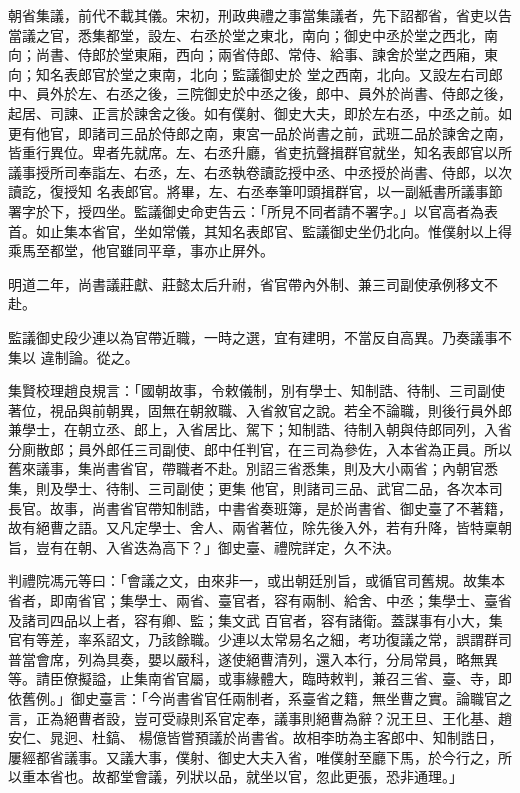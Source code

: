 \begin{pinyinscope}
 朝省集議，前代不載其儀。宋初，刑政典禮之事當集議者，先下詔都省，省吏以告當議之官，悉集都堂，設左、右丞於堂之東北，南向；御史中丞於堂之西北，南向；尚書、侍郎於堂東廂，西向；兩省侍郎、常侍、給事、諫舍於堂之西廂，東向；知名表郎官於堂之東南，北向；監議御史於
 堂之西南，北向。又設左右司郎中、員外於左、右丞之後，三院御史於中丞之後，郎中、員外於尚書、侍郎之後，起居、司諫、正言於諫舍之後。如有僕射、御史大夫，即於左右丞，中丞之前。如更有他官，即諸司三品於侍郎之南，東宮一品於尚書之前，武班二品於諫舍之南，皆重行異位。卑者先就席。左、右丞升廳，省吏抗聲揖群官就坐，知名表郎官以所議事授所司奉詣左、右丞，左、右丞執卷讀訖授中丞、中丞授於尚書、侍郎，以次讀訖，復授知
 名表郎官。將畢，左、右丞奉筆叩頭揖群官，以一副紙書所議事節署字於下，授四坐。監議御史命吏告云：「所見不同者請不署字。」以官高者為表首。如止集本省官，坐如常儀，其知名表郎官、監議御史坐仍北向。惟僕射以上得乘馬至都堂，他官雖同平章，事亦止屏外。



 明道二年，尚書議莊獻、莊懿太后升祔，省官帶內外制、兼三司副使承例移文不赴。



 監議御史段少連以為官帶近職，一時之選，宜有建明，不當反自高異。乃奏議事不集以
 違制論。從之。



 集賢校理趙良規言：「國朝故事，令敕儀制，別有學士、知制誥、待制、三司副使著位，視品與前朝異，固無在朝敘職、入省敘官之說。若全不論職，則後行員外郎兼學士，在朝立丞、郎上，入省居比、駕下；知制誥、待制入朝與侍郎同列，入省分廁散郎；員外郎任三司副使、郎中任判官，在三司為參佐，入本省為正員。所以舊來議事，集尚書省官，帶職者不赴。別詔三省悉集，則及大小兩省；內朝官悉集，則及學士、待制、三司副使；更集
 他官，則諸司三品、武官二品，各次本司長官。故事，尚書省官帶知制誥，中書省奏班簿，是於尚書省、御史臺了不著籍，故有絕曹之語。又凡定學士、舍人、兩省著位，除先後入外，若有升降，皆特稟朝旨，豈有在朝、入省迭為高下？」御史臺、禮院詳定，久不決。



 判禮院馮元等曰：「會議之文，由來非一，或出朝廷別旨，或循官司舊規。故集本省者，即南省官；集學士、兩省、臺官者，容有兩制、給舍、中丞；集學士、臺省及諸司四品以上者，容有卿、監；集文武
 百官者，容有諸衛。蓋謀事有小大，集官有等差，率系詔文，乃該餘職。少連以太常易名之細，考功復議之常，誤謂群司普當會席，列為具奏，嬰以嚴科，遂使絕曹清列，還入本行，分局常員，略無異等。請臣僚擬謚，止集南省官屬，或事緣體大，臨時敕判，兼召三省、臺、寺，即依舊例。」御史臺言：「今尚書省官任兩制者，系臺省之籍，無坐曹之實。論職官之言，正為絕曹者設，豈可受祿則系官定奉，議事則絕曹為辭？況王旦、王化基、趙安仁、晁迥、杜鎬、
 楊億皆嘗預議於尚書省。故相李昉為主客郎中、知制誥日，屢經都省議事。又議大事，僕射、御史大夫入省，唯僕射至廳下馬，於今行之，所以重本省也。故都堂會議，列狀以品，就坐以官，忽此更張，恐非通理。」




\end{pinyinscope}
